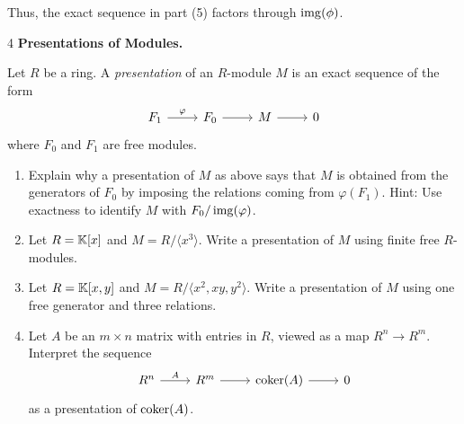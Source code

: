 \documentclass[Notebook.tex]{subfiles}
\begin{document}
\begin{solution}
\begin{enumerate}
        Thus, the exact sequence in part (5) factors through $\operatorname{img}(\phi)$. 
        
    \end{enumerate}
\end{solution}

\newpage 

\begin{problem}{4} \textbf{Presentations of Modules.} 
    
    Let $R$ be a ring. A \emph{presentation} of an $R$-module $M$ is an exact sequence of the form
    \[
    \begin{tikzcd}
    F_1 \arrow[r, "\varphi"] & F_0 \arrow[r] & M \arrow[r] & 0
    \end{tikzcd}
    \]
    where $F_0$ and $F_1$ are free modules.
    \begin{enumerate}
        \item  Explain why a presentation of $M$ as above says that $M$ is obtained from the generators of $F_0$ by imposing the relations coming from $\varphi(F_1)$. Hint: Use exactness to identify $M$ with $F_0/\operatorname{img}(\varphi)$.
        \item Let $R=\mathbb K[x]$ and $M=R/\langle x^3\rangle$. Write a presentation of $M$ using finite free $R$-modules.
        \item Let $R=\mathbb K[x,y]$ and $M=R/\langle x^2,xy,y^2\rangle$. Write a presentation of $M$ using one free generator and three relations.
        \item Let $A$ be an $m\times n$ matrix with entries in $R$, viewed as a map $R^n\to R^m$. Interpret the sequence
        \[
        \begin{tikzcd}
        R^n \arrow[r, "A"] & R^m \arrow[r] & \coker(A) \arrow[r] & 0
        \end{tikzcd}
        \]
        as a presentation of $\operatorname{coker}(A)$.
    \end{enumerate}    
\end{problem}
\end{document}
